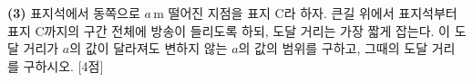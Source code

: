 \documentclass[10pt]{article}
\begin{document}
\begin{pagepair}
{\textbf{(3)} 표지석에서 동쪽으로 $a\,\mathrm{m}$ 떨어진 지점을 표지 $\mathrm{C}$라 하자. 큰길 위에서 표지석부터 표지 $\mathrm{C}$까지의 구간 전체에 방송이 들리도록 하되, 도달 거리는 가장 짧게 잡는다. 이 도달 거리가 $a$의 값이 달라져도 변하지 않는 $a$의 값의 범위를 구하고, 그때의 도달 거리를 구하시오. [4점]
\vspace*{-13.6mm}
\vfill\null
}
\end{pagepair}
\end{document}
